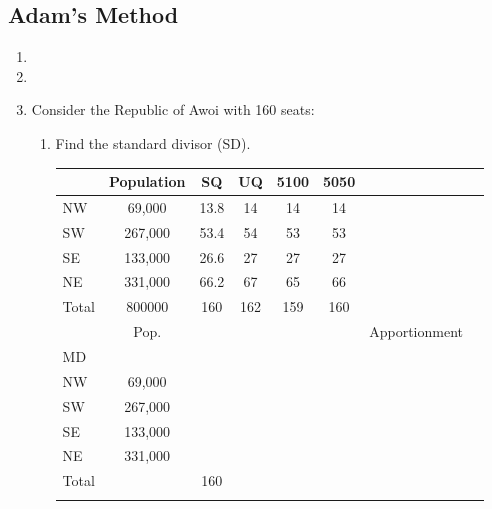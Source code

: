 	\subsection{Adam's Method}
\begin{enumerate}
	\item 	   {} 
	\item 	   {}
	
	\item Consider the Republic of Awoi with 160 seats:
		\begin{enumerate}
		\item Find the standard divisor (SD).
		
		
		\begin{tabular}{l|c|c|c|c|c|c|c} \hline \ifsolns
		 & Population & SQ & UQ & 5100 & 5050\\\hline
 NW  & 69,000 & 13.8 & 14 & 14 & 14\\\hline
 SW  & 267,000 & 53.4 & 54 & 53 & 53\\\hline
 SE  & 133,000 & 26.6 & 27 & 27 & 27\\\hline
 NE  & 331,000 & 66.2 & 67 & 65 & 66\\\hline
Total  & 800000 & 160 & 162 & 159 & 160\\\hline
\else
	&	Pop. & \hspace{.75cm} 	& \hspace{.75cm}	& \hspace{.75cm} 	&\hspace{.75cm} 	&  	 	Apportionment \\\hline
MD	&&&&&&&\\\hline
	 NW &	69,000	&&&&&&\\\hline			
	 SW &	267,000	&&&&&&\\\hline			
	 SE &	133,000				&&&&&&\\\hline
	 NE &	 331,000 &&&&&&\\\hline
	 Total & &160&&&&&\\\hline \fi
	\end{tabular}
	

\end{enumerate}
\end{enumerate}
